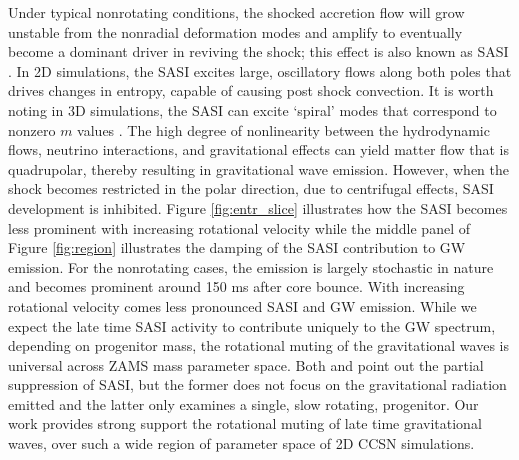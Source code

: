 \documentclass[twocolumn,times]{aastex62}  %
\begin{document}
Under typical nonrotating conditions, the shocked accretion flow will grow unstable from the nonradial deformation modes and amplify to eventually become a dominant driver in reviving the shock; this effect is also known as SASI \citep{scheck:2008,marek:2009a}.  In 2D simulations, the SASI excites large, oscillatory flows along both poles that drives changes in entropy, capable of causing post shock convection.  It is worth noting in 3D simulations, the SASI can excite `spiral' modes that correspond to nonzero $m$ values \citep{blondin:2007,kuroda:2016}.  The high degree of nonlinearity between the hydrodynamic flows, neutrino interactions, and gravitational effects can yield matter flow that is quadrupolar, thereby resulting in gravitational wave emission.  However, when the shock becomes restricted in the polar direction, due to centrifugal effects, SASI development is inhibited. Figure \ref{fig:entr_slice} illustrates how the SASI becomes less prominent with increasing rotational velocity while the middle panel of Figure \ref{fig:region} illustrates the damping of the SASI contribution to GW emission.  For the nonrotating cases, the emission is largely stochastic in nature and becomes prominent around 150 ms after core bounce.  With increasing rotational velocity comes less pronounced SASI and GW emission.  
While we expect the late time SASI activity to contribute uniquely to the GW spectrum, depending on progenitor mass, the rotational muting of the gravitational waves is universal across ZAMS mass parameter space.  
Both \citet{burrows:2007}  and \citet{moro:2018} point out the partial suppression of SASI, but the former does not focus on the gravitational radiation emitted and the latter only examines a single, slow rotating, progenitor.  Our work provides strong support the rotational muting of late time gravitational waves, over such a wide region of parameter space of 2D CCSN simulations. 
 
\end{document}
